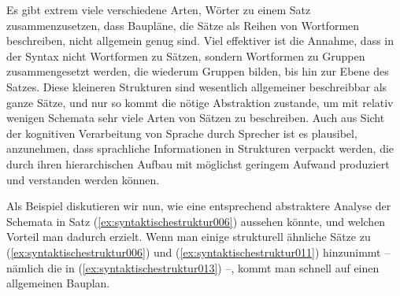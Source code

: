 Es gibt extrem viele verschiedene Arten, Wörter zu einem Satz zusammenzusetzen, dass Baupläne, die Sätze als Reihen von Wortformen beschreiben, nicht allgemein genug sind.
Viel effektiver ist die Annahme, dass in der Syntax nicht Wortformen zu Sätzen, sondern Wortformen zu Gruppen zusammengesetzt werden, die wiederum Gruppen bilden, bis hin zur Ebene des Satzes.
Diese kleineren Strukturen sind wesentlich allgemeiner beschreibbar als ganze Sätze, und nur so kommt die nötige Abstraktion zustande, um mit relativ wenigen Schemata sehr viele Arten von Sätzen zu beschreiben.
Auch aus Sicht der kognitiven Verarbeitung von Sprache durch Sprecher ist es plausibel, anzunehmen, dass sprachliche Informationen in Strukturen verpackt werden, die durch ihren hierarchischen Aufbau mit möglichst geringem Aufwand produziert und verstanden werden können.

Als Beispiel diskutieren wir nun, wie eine entsprechend abstraktere Analyse der Schemata in Satz (\ref{ex:syntaktischestruktur006}) aussehen könnte, und welchen Vorteil man dadurch erzielt.
Wenn man einige strukturell ähnliche Sätze zu (\ref{ex:syntaktischestruktur006}) und (\ref{ex:syntaktischestruktur011}) hinzunimmt -- nämlich die in (\ref{ex:syntaktischestruktur013}) --, kommt man schnell auf einen allgemeinen Bauplan.

\begin{exe}
  \ex\label{ex:syntaktischestruktur013}
  \begin{xlist}
  \end{xlist}
\end{exe}

